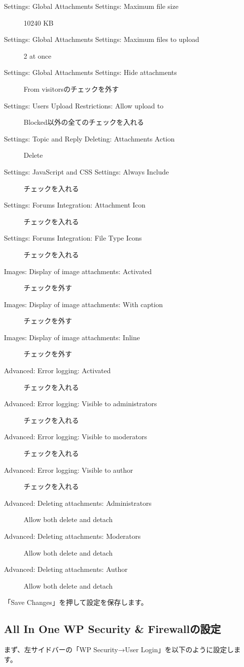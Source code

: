 \documentclass[titlepage,10pt,a4paper,uplatex]{jsbook}
\begin{document}
\begin{description}
\item[Settings: Global Attachments Settings: Maximum file size] 10240 KB
\item[Settings: Global Attachments Settings: Maximum files to upload] 2 at once
\item[Settings: Global Attachments Settings: Hide attachments] From visitorsのチェックを外す
\item[Settings: Users Upload Restrictions: Allow upload to] Blocked以外の全てのチェックを入れる
\item[Settings: Topic and Reply Deleting: Attachments Action] Delete
\item[Settings: JavaScript and CSS Settings: Always Include] チェックを入れる
\item[Settings: Forums Integration: Attachment Icon] チェックを入れる
\item[Settings: Forums Integration: File Type Icons] チェックを入れる
\item[Images: Display of image attachments: Activated] チェックを外す
\item[Images: Display of image attachments: With caption] チェックを外す
\item[Images: Display of image attachments: Inline] チェックを外す
\item[Advanced: Error logging: Activated] チェックを入れる
\item[Advanced: Error logging: Visible to administrators] チェックを入れる
\item[Advanced: Error logging: Visible to moderators] チェックを入れる
\item[Advanced: Error logging: Visible to author] チェックを入れる
\item[Advanced: Deleting attachments: Administrators] Allow both delete and detach
\item[Advanced: Deleting attachments: Moderators] Allow both delete and detach
\item[Advanced: Deleting attachments: Author] Allow both delete and detach
\end{description}

「Save Changes」を押して設定を保存します。

\subsection{All In One WP Security \& Firewallの設定}

まず、左サイドバーの「WP Security→User Login」を以下のように設定します。
\end{document}
